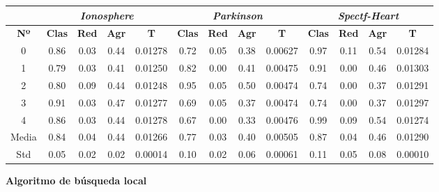 \documentclass[10pt, a4paper]{article}
\theoremstyle{theorem-style}
\theoremstyle{theorem-style}
\theoremstyle{theorem2-style}
\theoremstyle{definition-style}
\theoremstyle{remark-style}
\theoremstyle{example-style}
\theoremstyle{definition-style}
\theoremstyle{remark-style}
\theoremstyle{remark-style}
\begin{document}
\begin{table}[ht!]
\begin{tabular}{ccccc|cccc|cccc}
\centering
 & \multicolumn{4}{c}{\textit{Ionosphere}} & \multicolumn{4}{c}{\textit{Parkinson}} & \multicolumn{4}{c}{\textit{Spectf-Heart}} \\ \hline
\textbf{Nº} & \textbf{Clas} & \textbf{Red} & \textbf{Agr} & \textbf{T} & \textbf{Clas} & \textbf{Red} & \textbf{Agr} & \textbf{T} & \textbf{Clas} & \textbf{Red} & \textbf{Agr} & \textbf{T} \\ \hline
0&	 0.86 & 0.03 & 0.44 & 0.01278 & 	0.72 & 0.05 & 0.38 & 0.00627 & 		0.97 & 0.11 & 0.54 & 0.01284 \\ 
1&	 0.79 & 0.03 & 0.41 & 0.01250 & 	0.82 & 0.00 & 0.41 & 0.00475 & 		0.91 & 0.00 & 0.46 & 0.01303 \\ 
2&	 0.80 & 0.09 & 0.44 & 0.01248 & 	0.95 & 0.05 & 0.50 & 0.00474 & 		0.74 & 0.00 & 0.37 & 0.01291 \\ 
3&	 0.91 & 0.03 & 0.47 & 0.01277 & 	0.69 & 0.05 & 0.37 & 0.00474 & 		0.74 & 0.00 & 0.37 & 0.01297 \\ 
4&	 0.86 & 0.03 & 0.44 & 0.01278 & 	0.67 & 0.00 & 0.33 & 0.00476 & 		0.99 & 0.09 & 0.54 & 0.01274 \\ 
\hline
Media&	 0.84 & 0.04 & 0.44 & 0.01266	& 0.77 & 0.03 & 0.40 & 0.00505		&0.87 & 0.04 & 0.46 & 0.01290
 \\ Std&	 0.05 & 0.02 & 0.02 & 0.00014	&0.10 & 0.02 & 0.06 & 0.00061	&	0.11 & 0.05 & 0.08 & 0.00010
 \\

\end{tabular}
\end{table}

\textbf{Algoritmo de búsqueda local}
\end{document}
